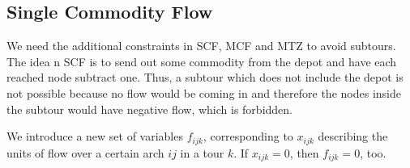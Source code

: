 \subsection{Single Commodity Flow}

We need the additional constraints in SCF, MCF and MTZ to avoid subtours. The idea n SCF is
to send out some commodity from the depot and have each reached node subtract one. Thus, a 
subtour which does not include the depot is not possible because no flow would be coming in
and therefore the nodes inside the subtour would have negative flow, which is forbidden.

We introduce a new set of variables $f_{ijk}$, corresponding to $x_{ijk}$ describing the units
of flow over a certain arch $ij$ in a tour $k$. If $x_{ijk} = 0$, then $f_{ijk} = 0$, too.

